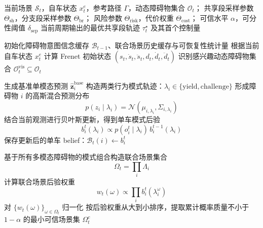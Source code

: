 
\begin{algorithm}[t]
\caption{面向多模态交互场景的共享段--条件分支一体化滚动规划算法}
\label{alg:belief_contingency_planning}
\footnotesize
\begin{algorithmic}[1]
\Require 当前场景 $\mathcal{S}_t$，自车状态 $x_t^{e}$，参考路径 $\Gamma$，动态障碍物集合 $\mathcal{O}_t$；
\Statex \hspace{\algorithmicindent}共享段采样参数 $\Theta_{\mathrm{sh}}$，分支段采样参数 $\Theta_{\mathrm{br}}$；
\Statex \hspace{\algorithmicindent}风险参数 $\Theta_{\mathrm{risk}}$，代价权重 $\Theta_{\mathrm{cost}}$；
\Statex \hspace{\algorithmicindent}可信水平 $\alpha$，可分性阈值 $\delta_{\mathrm{sep}}$
\Ensure 当前周期输出的最优共享段轨迹 $\tau_t^{\star}$ 及其首个控制量

\State 初始化障碍物意图信念缓存 $\mathcal{B}_{t-1}$、联合场景历史缓存与可恢复性统计量
    \State 根据当前自车状态 $x_t^{e}$ 计算 Frenet 初始状态 $(s_t,\dot{s}_t,\ddot{s}_t,d_t,\dot{d}_t,\ddot{d}_t)$
    \State 识别感兴趣动态障碍物集合 $\mathcal{O}_t^{\mathrm{vis}} \subseteq \mathcal{O}_t$

        \State 生成基准单模态预测 $\hat{\mathbf{z}}_i^{\mathrm{base}}$
        \State 构造两类行为模式轨迹：$\lambda_i \in \{\mathrm{yield},\mathrm{challenge}\}$
        \State 形成障碍物 $i$ 的高斯混合预测分布
        \[
            p(z_i \mid \lambda_i) = \mathcal{N}\!\left(\mu_{i,\lambda_i}, \Sigma_{i,\lambda_i}\right)
        \]
        \State 结合当前观测进行贝叶斯更新，得到单车模式后验
        \[
            b_i^t(\lambda_i) \propto p(o_i^t \mid \lambda_i)\, b_i^{t-1}(\lambda_i)
        \]
        \State 保存更新后的单车 belief：$\mathcal{B}_t(i) \gets b_i^t$
    \EndFor

    \State 基于所有多模态障碍物的模式组合构造联合场景集合
    \[
        \Omega_t = \prod_{i} \Lambda_i
    \]
        \State 计算联合场景后验权重
        \[
            w_t(\omega) \propto \prod_i b_i^t(\lambda_i^\omega)
        \]
    \EndFor
    \State 对 $\{w_t(\omega)\}_{\omega \in \Omega_t}$ 归一化
    \State 按后验权重从大到小排序，提取累计概率质量不小于 $1-\alpha$ 的最小可信场景集 $\Omega_t^{c}$


\end{algorithmic}
\end{algorithm}
